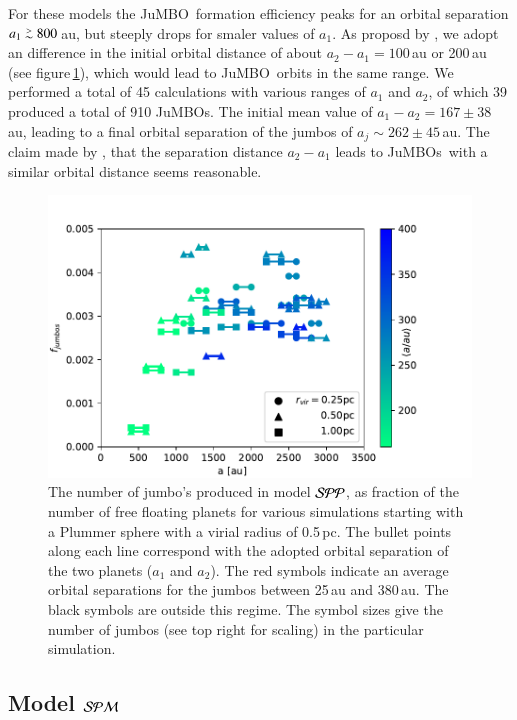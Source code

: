 \documentclass[aa]{lib/aa}
\def\apgt{\ {\raise-.5ex\hbox{$\buildrel>\over\sim$}}\ }
\newcommand{\jumbo}{\mbox{JuMBO}}
\newcommand{\jumbos}{\mbox{JuMBOs}}
\begin{document}
For these models the \jumbo\, formation efficiency peaks for an
orbital separation $a_1 \apgt 800$\,au, but steeply drops for smaler
values of $a_1$. As proposd by \cite{2023arXiv231006016W}, we adopt an
difference in the initial orbital distance of about $a_2-a_1 =
100$\,au or 200\,au (see figure\,\ref{Fig:fjumbos_from_PP}), which
would lead to \jumbo\, orbits in the same range.  We performed a total
of 45 calculations with various ranges of $a_1$ and $a_2$, of which 39
produced a total of 910 \jumbos. The initial mean value of $a_1-a_2 =
167\pm38$\,au, leading to a final orbital separation of the jumbos of
$a_j \sim 262\pm45$\,au.  The claim made by
\cite{2023arXiv231006016W}, that the separation distance $a_2-a_1$
leads to \jumbos\, with a similar orbital distance seems reasonable.

\begin{figure}
    \centering
        \includegraphics[width=.91\columnwidth]{figures/fig_fjumbos_from_psystems.pdf}
        \caption{The number of jumbo's produced in model ${\cal SPP}$,
          as fraction of the number of free floating planets for
          various simulations starting with a Plummer sphere with a
          virial radius of 0.5\,pc.  The bullet points along each line
          correspond with the adopted orbital separation of the two
          planets ($a_1$ and $a_2$).  The red symbols indicate an
          average orbital separations for the jumbos between 25\,au
          and 380\,au.  The black symbols are outside this regime.
          The symbol sizes give the number of jumbos (see top right
          for scaling) in the particular simulation.  }
         \label{Fig:fjumbos_from_PP}
\end{figure}

\subsection{Model ${\cal SPM}$}
\end{document}
